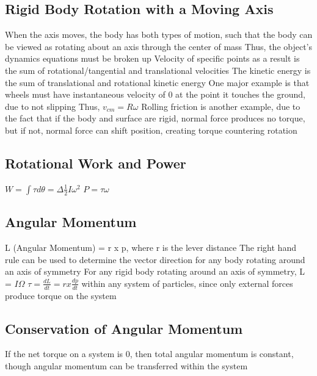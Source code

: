 \documentclass[11 pt, twoside]{article}
\newenvironment{outline*}
{
	\begin{outline}[enumerate]
	}
	{\end{outline}
}
\begin{document}
\subsection{Rigid Body Rotation with a Moving Axis}
\begin{outline*}
\1 When the axis moves, the body has both types of motion, such that the body can be viewed as rotating about an axis through the center of mass
\2 Thus, the object’s dynamics equations must be broken up
\2 Velocity of specific points as a result is the sum of rotational/tangential and translational velocities
\1 The kinetic energy is the sum of translational and rotational kinetic energy
\1 One major example is that wheels must have instantaneous velocity of 0 at the point it touches the ground, due to not slipping
\2 Thus, $v_{cm} = R\omega$
\1 Rolling friction is another example, due to the fact that if the body and surface are rigid, normal force produces no torque, but if not, normal force can shift position, creating torque countering rotation
\end{outline*}
\subsection{Rotational Work and Power}
\begin{outline*}
\1 $W = \int \tau d\theta = \Delta\frac{1}{2}I\omega^2$
\1 $P = \tau\omega$
\end{outline*}
\subsection{Angular Momentum}
\begin{outline*}
\1 L (Angular Momentum) = r x p, where r is the lever distance
\2 The right hand rule can be used to determine the vector direction for any body rotating around an axis of symmetry
\2 For any rigid body rotating around an axis of symmetry, L = $I\Omega$
\1 $\tau = \frac{dL}{dt} = r x \frac{dp}{dt}$ within any system of particles, since only external forces produce torque on the system
\end{outline*}
\subsection{Conservation of Angular Momentum}
\begin{outline*}
\1 If the net torque on a system is 0, then total angular momentum is constant, though angular momentum can be transferred within the system
\end{outline*}
\end{document}
